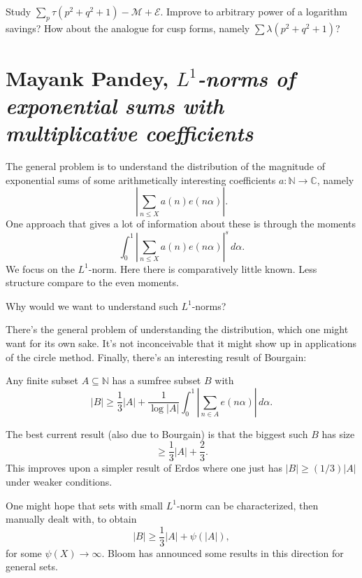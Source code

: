 \documentclass[reqno]{amsart} 
\begin{document}
Study $\sum_{p}\tau (p^2 + q^2 + 1) - \mathcal{M} + \mathcal{E}$.  Improve to arbitrary power of a logarithm savings?  How about the analogue for cusp forms, namely $\sum \lambda (p^2 + q^2 + 1)$?

\section{Mayank Pandey, \emph{$L^1$-norms of exponential sums with multiplicative coefficients}}

The general problem is to understand the distribution of the magnitude of exponential sums of some arithmetically interesting coefficients $a : \mathbb{N} \rightarrow \mathbb{C} $, namely
\begin{equation*}
  \left\lvert \sum_{n \leq X} a (n )  e(n \alpha)  \right\rvert.
\end{equation*}
One approach that gives a lot of information about these is through the moments
\begin{equation*}
  \int_0^1 \left\lvert \sum_{n \leq X } a (n ) e (n \alpha ) \right\rvert^s \, d \alpha.
\end{equation*}
We focus on the $L^1$-norm.  Here there is comparatively little known.  Less structure compare to the even moments.

Why would we want to understand such $L^1$-norms?

There's the general problem of understanding the distribution, which one might want for its own sake.  It's not inconceivable that it might show up in applications of the circle method.  Finally, there's an interesting result of Bourgain:
\begin{theorem}
  Any finite subset $A \subseteq \mathbb{N} $ has a sumfree subset $B$ with
  \begin{equation*}
    \lvert B \rvert \geq \frac{1}{3} \lvert A \rvert + \frac{1}{ \log \lvert A \rvert} \int_0^1 \left\lvert \sum_{n \in A } e (n \alpha ) \right\rvert \, d \alpha.
  \end{equation*}
\end{theorem}
The best current result (also due to Bourgain) is that the biggest such $B$ has size
\begin{equation*}
  \geq \frac{1}{3} \lvert A \rvert + \frac{2}{3}.
\end{equation*}
This improves upon a simpler result of Erdos where one just has $|B| \geq (1/3) |A|$ under weaker conditions.

One might hope that sets with small $L^1$-norm can be characterized, then manually dealt with, to obtain
\begin{equation*}
  \lvert B \rvert \geq \frac{1}{3} \lvert A \rvert + \psi (\lvert A \rvert),
\end{equation*}
for some $\psi(X) \rightarrow \infty $.  Bloom has announced some results in this direction for general sets.
\end{document}
